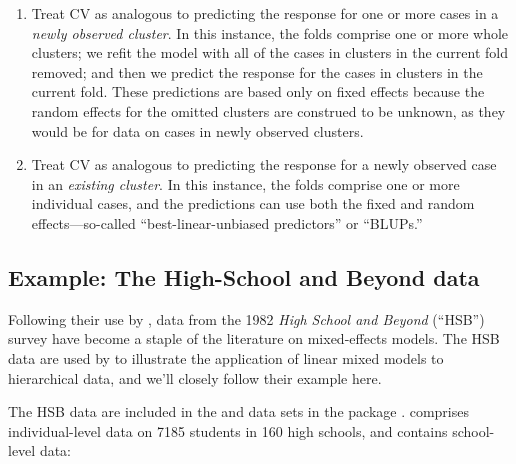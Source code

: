 \documentclass[
]{jss}
\begin{document}
\begin{enumerate}
\def\labelenumi{\arabic{enumi}.}
\item
  Treat CV as analogous to predicting the response for one or more cases
  in a \emph{newly observed cluster}. In this instance, the folds
  comprise one or more whole clusters; we refit the model with all of
  the cases in clusters in the current fold removed; and then we predict
  the response for the cases in clusters in the current fold. These
  predictions are based only on fixed effects because the random effects
  for the omitted clusters are construed to be unknown, as they would be
  for data on cases in newly observed clusters.
\item
  Treat CV as analogous to predicting the response for a newly observed
  case in an \emph{existing cluster}. In this instance, the folds
  comprise one or more individual cases, and the predictions can use
  both the fixed and random effects---so-called ``best-linear-unbiased
  predictors'' or ``BLUPs.''
\end{enumerate}

\subsection{Example: The High-School and Beyond
data}\label{example-the-high-school-and-beyond-data}

Following their use by \citet{RaudenbushBryk:2002}, data from the 1982
\emph{High School and Beyond} (``HSB'') survey have become a staple of
the literature on mixed-effects models. The HSB data are used by
\citet[Sec.~7.2.2]{FoxWeisberg:2019} to illustrate the application of
linear mixed models to hierarchical data, and we'll closely follow their
example here.

The HSB data are included in the  and
 data sets in the  package
\citep{PinheiroBates:2000}.  comprises
individual-level data on 7185 students in 160 high schools, and
 contains school-level data:
\end{document}
